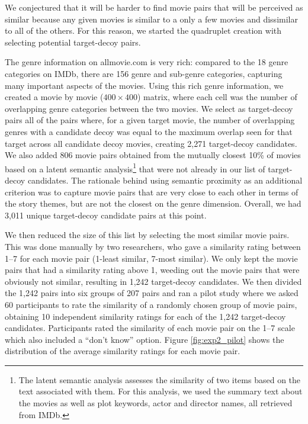 \documentclass[12pt, a4paper]{article}
\begin{document}
We conjectured that it will be harder to find movie pairs that will be perceived as similar because any given movies is similar to a only a few movies and dissimilar to all of the others. For this reason, we started the quadruplet creation with selecting potential target-decoy pairs.

The genre information on allmovie.com is very rich: compared to the 18 genre categories on IMDb, there are 156 genre and sub-genre categories, capturing many important aspects of the movies. Using this rich genre information, we created a movie by movie ($400 \times 400$) matrix, where each cell was the number of overlapping genre categories between the two movies. We select as target-decoy pairs all of the pairs where, for a given target movie, the number of overlapping genres with a candidate decoy was equal to the maximum overlap seen for that target across all candidate decoy movies, creating 2,271 target-decoy candidates. 
We also added 806 movie pairs obtained from the mutually closest 10\% of movies based on a latent semantic analysis\footnote{The latent semantic analysis assesses the similarity of two items based on the text associated with them. For this analysis, we used the summary text about the movies as well as plot keywords, actor and director names, all retrieved from IMDb.} that were not already in our list of target-decoy candidates. The rationale behind using semantic proximity as an additional criterion was to capture movie pairs that are very close to each other in terms of the story themes, but are not the closest on the genre dimension. Overall, we had 3,011 unique target-decoy candidate pairs at this point. 

We then reduced the size of this list by selecting the most similar movie pairs. This was done manually by two researchers, who gave a similarity rating between 1--7 for each movie pair (1-least similar, 7-most similar). We only kept the movie pairs that had a similarity rating above 1, weeding out the movie pairs that were obviously not similar, resulting in 1,242 target-decoy candidates. We then divided the 1,242 pairs into six groups of 207 pairs and ran a pilot study where we asked 60 participants to rate the similarity of a randomly chosen group of movie pairs, obtaining 10 independent similarity ratings for each of the 1,242 target-decoy candidates. Participants rated the similarity of each movie pair on the 1--7 scale which also included a ``don't know'' option. Figure \ref{fig:exp2_pilot}  shows the distribution of the average similarity ratings for each movie pair. 
\end{document}
